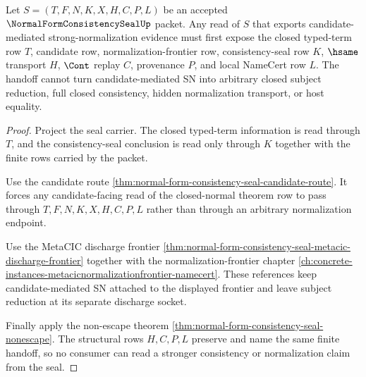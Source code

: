 \begin{theorem}
\label{thm:normal-form-consistency-seal-candidate-mediated-sn-handoff}
Let $S=(T,F,N,K,X,H,C,P,L)$ be an accepted
$\NormalFormConsistencySealUp$ packet. Any read of $S$ that exports
candidate-mediated strong-normalization evidence must first expose the closed
typed-term row $T$, candidate row, normalization-frontier row, consistency-seal
row $K$, $\hsame$ transport $H$, $\Cont$ replay $C$, provenance $P$, and local
NameCert row $L$. The handoff cannot turn candidate-mediated SN into arbitrary
closed subject reduction, full closed consistency, hidden normalization
transport, or host equality.
\end{theorem}
\begin{proof}
Project the seal carrier. The closed typed-term information is read through
$T$, and the consistency-seal conclusion is read only through $K$ together
with the finite rows carried by the packet.

Use the candidate route
\autoref{thm:normal-form-consistency-seal-candidate-route}. It forces any
candidate-facing read of the closed-normal theorem row to pass through
$T,F,N,K,X,H,C,P,L$ rather than through an arbitrary normalization endpoint.

Use the MetaCIC discharge frontier
\autoref{thm:normal-form-consistency-seal-metacic-discharge-frontier} together
with the normalization-frontier chapter
\autoref{ch:concrete-instances-metacicnormalizationfrontier-namecert}. These
references keep candidate-mediated SN attached to the displayed frontier and
leave subject reduction at its separate discharge socket.

Finally apply the non-escape theorem
\autoref{thm:normal-form-consistency-seal-nonescape}. The structural rows
$H,C,P,L$ preserve and name the same finite handoff, so no consumer can read a
stronger consistency or normalization claim from the seal.
\end{proof}

